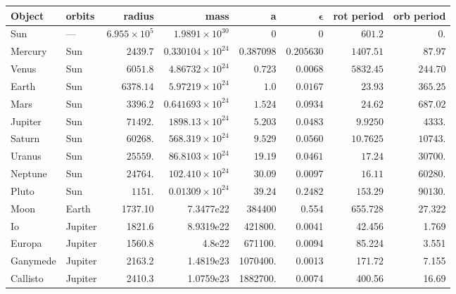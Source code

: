 \documentclass[11pt]{article}
\begin{document}
\begin{table}
\begin{tabular}{llrrrrrr}
\textbf{Object}	& \textbf{orbits} & \textbf{radius} & \textbf{mass} & \textbf{a} 
  & $\mathbf{\epsilon}$ &  \textbf{rot period} & \textbf{orb period} \\ \hline
Sun	& ---	 & $6.955\times10^5$   & $1.9891\times10^{30}$   & $0$     & $0$      & $601.2$	   & $0.$ \\
Mercury	& Sun	 & $2439.7$    & $0.330104\times10^{24}$ & $0.387098$ & $0.205630$ & $1407.51$	   & $87.97$ \\
Venus	& Sun	 & $6051.8$    & $4.86732\times10^{24}$  & $0.723$ & $0.0068$ & $5832.45$	   & $244.70$ \\
Earth	& Sun	 & $6378.14$   & $5.97219\times10^{24}$  & $1.0$   & $0.0167$ & $23.93$      & $365.25$ \\
Mars	& Sun	 & $3396.2$    & $0.641693\times10^{24}$ & $1.524$ & $0.0934$ & $24.62$      & $687.02$ \\
Jupiter	& Sun	 & $71492.$    & $1898.13\times10^{24}$  & $5.203$ & $0.0483$ & $9.9250$     & $4333.$ \\
Saturn	& Sun	 & $60268.$    & $568.319\times10^{24}$  & $9.529$ & $0.0560$ & $10.7625$    & $10743.$ \\
Uranus	& Sun	 & $25559.$    & $86.8103\times10^{24}$  & $19.19$ & $0.0461$ & $17.24$      & $30700.$ \\
Neptune	& Sun	 & $24764.$    & $102.410\times10^{24}$  & $30.09$ & $0.0097$ & $16.11$      & $60280.$ \\
Pluto	& Sun	 & $1151.$     & $0.01309\times10^{24}$  & $39.24$ & $0.2482$ & $153.29$     & $90130.$ \\

Moon	& Earth  & 1737.10   & 7.3477e22   & 384400    & 0.554   & 655.728 & 27.322 \\

Io	 & Jupiter & 1821.6  & 8.9319e22   & 421800.   & 0.0041  & 42.456  & 1.769 \\
Europa	 & Jupiter & 1560.8  & 4.8e22      & 671100.   & 0.0094  & 85.224  & 3.551 \\
Ganymede & Jupiter & 2163.2  & 1.4819e23   & 1070400.  & 0.0013  & 171.72  & 7.155 \\
Callisto & Jupiter & 2410.3  & 1.0759e23   & 1882700.  & 0.0074  & 400.56  & 16.69 \\


\end{tabular}
\end{table}
\end{document}
